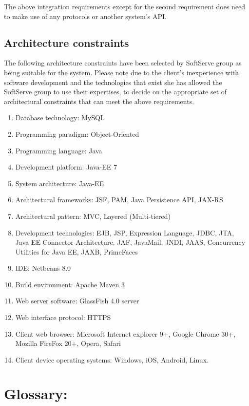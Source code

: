 \documentclass[12pt]{article}
\begin{document}
The above integration requirements except for the second requirement does need to make use of any protocols or another system's API.

\vspace{0.2in}

\subsection{Architecture constraints}
\vspace{0.2in}

The following architecture constraints have been selected by SoftServe group as being suitable for the system. Please note due to the client's inexperience with software development and the technologies that exist she has allowed the SoftServe group to use their expertises, to decide on the appropriate set of architectural constraints that can meet the above requirements.
\begin{enumerate}
\item Database technology: MySQL
\item Programming paradigm: Object-Oriented
\item Programming language: Java
\item Development platform: Java-EE 7 
\item System architecture: Java-EE
\item Architectural frameworks: JSF, PAM, Java Persistence API, JAX-RS
\item Architectural pattern: MVC, Layered (Multi-tiered)
\item Development technologies: EJB, JSP, Expression Language, JDBC, JTA, Java EE Connector Architecture, JAF, JavaMail, JNDI, JAAS, Concurrency Utilities for Java EE, JAXB, PrimeFaces
\item IDE: Netbeans 8.0
\item Build environment: Apache Maven 3
\item Web server software: GlassFish 4.0 server
\item Web interface protocol: HTTPS
\item Client web browser: Microsoft Internet explorer 9+, Google Chrome 30+, Mozilla FireFox 20+, Opera, Safari
\item Client device operating systems: Windows, iOS, Android, Linux. 
\end{enumerate}
\vspace{0.5in}

\newpage
\section{Glossary:}
\vspace{0.2in}
\end{document}
